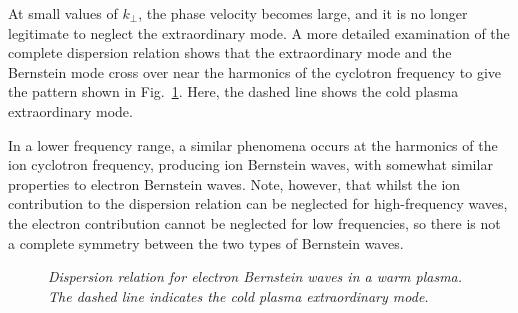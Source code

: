 At small values of $k_\perp$, the phase velocity becomes large, and
it is no longer legitimate to neglect the extraordinary mode. A more detailed
examination of the complete dispersion relation shows that the extraordinary mode
and the Bernstein mode cross over near the harmonics of the cyclotron frequency
to give the pattern shown in Fig.~\ref{f38}. Here, the dashed line shows the cold
plasma extraordinary mode. 

In a lower frequency range, a similar phenomena occurs at the
harmonics of the ion cyclotron frequency, producing ion Bernstein waves, with
somewhat similar properties to electron Bernstein waves. Note, however, that
whilst the ion contribution to the dispersion relation can be neglected for
high-frequency waves, the electron contribution cannot be neglected
for low frequencies, so there is not a complete symmetry between the
two types of Bernstein waves.

\begin{figure}
\epsfysize=4in
\centerline{}
\caption{\em Dispersion relation for electron Bernstein waves in a warm plasma. The dashed
line indicates the cold plasma extraordinary mode.}\label{f38}
\end{figure}